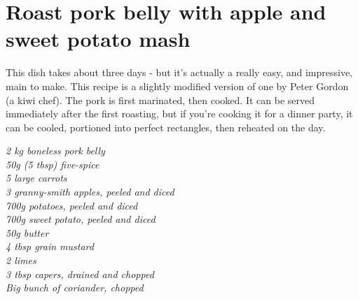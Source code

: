 \documentclass{tufte-book}
\begin{document}
\section{Roast pork belly with apple and sweet potato mash}

This dish takes about three days - but it's actually a really easy, and impressive, main to make. This recipe is a slightly modified version of one by Peter Gordon (a kiwi chef). The pork is first marinated, then cooked. It can be served immediately after the first roasting, but if you're cooking it for a dinner party, it can be cooled, portioned into perfect rectangles, then reheated on the day.

\smallskip
\emph{2 kg boneless pork belly
\\50g (5 tbsp) five-spice
\\5 large carrots
\\3 granny-smith apples, peeled and diced
\\700g potatoes, peeled and diced
\\700g sweet potato, peeled and diced
\\50g butter
\\4 tbsp grain mustard
\\2 limes
\\3 tbsp capers, drained and chopped
\\Big bunch of coriander, chopped
}

\newpage
\end{document}

